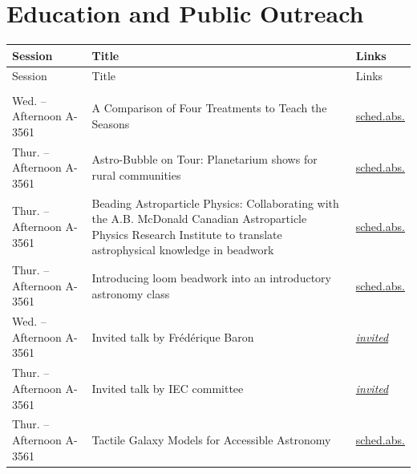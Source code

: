 \section*{Education and Public Outreach}
{\small
\setlength{\emergencystretch}{1em}
\begin{longtable}{@{}>{\TableRaggedRight\arraybackslash\hspace{0pt}}p{} >{\TableRaggedRight\arraybackslash\hspace{0pt}}p{} >{\TableRaggedRight\arraybackslash\hspace{0pt}}p{}@{}}
\toprule
Session & Title & Links \\
\midrule
\endfirsthead
\toprule
Session & Title & Links \\
\midrule
\endhead
\addlinespace[0.15em]
\multicolumn{3}{@{}l}{\sffamily\bfseries\color{cascateal} Talks} \\
\addlinespace[0.1em]
Wed. -- Afternoon A-3561 & A Comparison of Four Treatments to Teach the Seasons & \hyperlink{schedule-talk-3}{sched.}\newline \hyperlink{abstract-talk-3}{abs.} \\
Thur. -- Afternoon A-3561 & Astro-Bubble on Tour: Planetarium shows for rural communities & \hyperlink{schedule-talk-211}{sched.}\newline \hyperlink{abstract-talk-211}{abs.} \\
Thur. -- Afternoon A-3561 & Beading Astroparticle Physics: Collaborating with the A.B. McDonald Canadian Astroparticle Physics Research Institute to translate astrophysical knowledge in beadwork & \hyperlink{schedule-talk-55}{sched.}\newline \hyperlink{abstract-talk-55}{abs.} \\
Thur. -- Afternoon A-3561 & Introducing loom beadwork into an introductory astronomy class & \hyperlink{schedule-talk-11}{sched.}\newline \hyperlink{abstract-talk-11}{abs.} \\
Wed. -- Afternoon A-3561 & Invited talk by Frédérique Baron & \hyperlink{invited-frederique-baron}{\textit{invited}} \\
Thur. -- Afternoon A-3561 & Invited talk by IEC committee & \hyperlink{invited-iec-committee-sched}{\textit{invited}} \\
Thur. -- Afternoon A-3561 & Tactile Galaxy Models for Accessible Astronomy & \hyperlink{schedule-talk-180}{sched.}\newline \hyperlink{abstract-talk-180}{abs.} \\

\end{longtable}}
